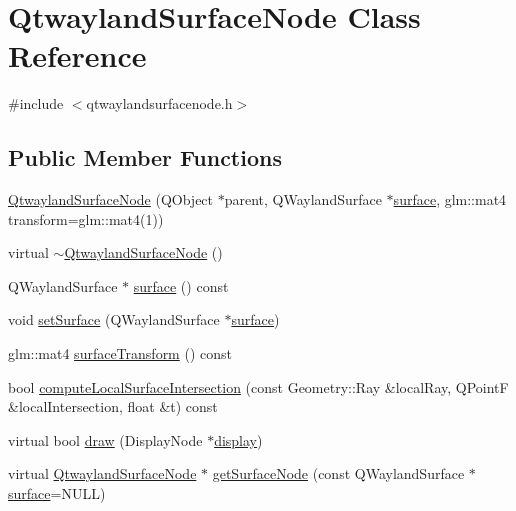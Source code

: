 \hypertarget{classQtwaylandSurfaceNode}{\section{Qtwayland\-Surface\-Node Class Reference}
\label{classQtwaylandSurfaceNode}
}


{\ttfamily \#include $<$qtwaylandsurfacenode.\-h$>$}

\subsection*{Public Member Functions}
\begin{DoxyCompactItemize}
\item 
\hyperlink{classQtwaylandSurfaceNode_a582fc9fb7bee6fecc1935c229bc84e72}{Qtwayland\-Surface\-Node} (Q\-Object $\ast$parent, Q\-Wayland\-Surface $\ast$\hyperlink{simple-egl_8cpp_a0720952aa1caded45b5bcdce589663a9}{surface}, glm\-::mat4 transform=glm\-::mat4(1))
\item 
virtual \hyperlink{classQtwaylandSurfaceNode_af762332b319b9239e955d4a69b165c14}{$\sim$\-Qtwayland\-Surface\-Node} ()
\item 
Q\-Wayland\-Surface $\ast$ \hyperlink{classQtwaylandSurfaceNode_a8f07c78202a2faa244d9d6c389c03951}{surface} () const 
\item 
void \hyperlink{classQtwaylandSurfaceNode_ace08a2691d01fe10087e9b6997d1523b}{set\-Surface} (Q\-Wayland\-Surface $\ast$\hyperlink{simple-egl_8cpp_a0720952aa1caded45b5bcdce589663a9}{surface})
\item 
glm\-::mat4 \hyperlink{classQtwaylandSurfaceNode_a8f88e9c392012d312206da67d6ea81ed}{surface\-Transform} () const 
\item 
bool \hyperlink{classQtwaylandSurfaceNode_a0307e078cfa9bcd6aaad60830ab5b3a6}{compute\-Local\-Surface\-Intersection} (const Geometry\-::\-Ray \&local\-Ray, Q\-Point\-F \&local\-Intersection, float \&t) const 
\item 
virtual bool \hyperlink{classQtwaylandSurfaceNode_a620c58196d857fe5146cfff49c6787fd}{draw} (Display\-Node $\ast$\hyperlink{structdisplay}{display})
\item 
virtual \hyperlink{classQtwaylandSurfaceNode}{Qtwayland\-Surface\-Node} $\ast$ \hyperlink{classQtwaylandSurfaceNode_a72db2bcd85e26d7f0332175f691a0dfd}{get\-Surface\-Node} (const Q\-Wayland\-Surface $\ast$\hyperlink{simple-egl_8cpp_a0720952aa1caded45b5bcdce589663a9}{surface}=N\-U\-L\-L)
\item 

\end{DoxyCompactItemize}
